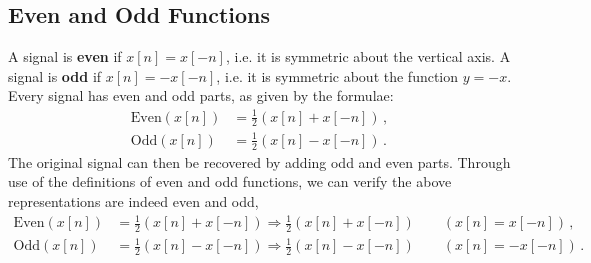 \subsection{Even and Odd Functions}
%
A signal is \textbf{even} if $x[n] = x[-n]$, i.e. it is symmetric about the vertical axis.
A signal is \textbf{odd} if $x[n] = -x[-n]$, i.e. it is symmetric about the function $y = -x$.
Every signal has even and odd parts, as given by the formulae:
%
\begin{align}
  \mathrm{Even}(x[n]) &= \frac{1}{2}(x[n] + x[-n]) \,, \\
  \mathrm{Odd}(x[n]) &= \frac{1}{2}(x[n] - x[-n])  \,.
\end{align}
%
The original signal can then be recovered by adding odd and even parts. Through use of the
definitions of even and odd functions, we can verify the above representations are indeed
even and odd,
%
\begin{align*}
  \mathrm{Even}(x[n]) &= \frac{1}{2}(x[n] + x[-n]) \Longrightarrow \frac{1}{2}(x[n] + x[-n]) \qquad (x[n] = x[-n])\,, \\
  \mathrm{Odd}(x[n]) &= \frac{1}{2}(x[n] - x[-n]) \Longrightarrow \frac{1}{2}(x[n] - x[-n]) \qquad (x[n] = -x[-n])\,.
\end{align*}


